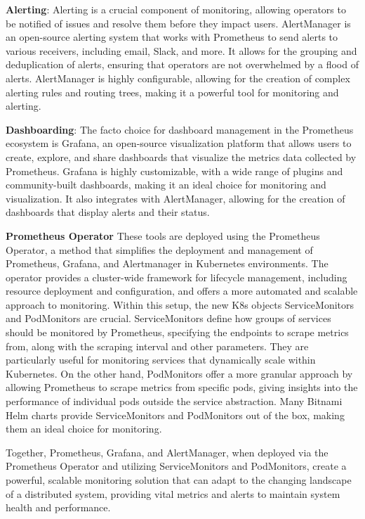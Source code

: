 \documentclass{article}
\begin{document}
    \textbf{Alerting}:
    Alerting is a crucial component of monitoring, allowing operators to be notified of issues and resolve them before they impact users. AlertManager is an open-source alerting system that works with Prometheus to send alerts to various receivers, including email, Slack, and more. It allows for the grouping and deduplication of alerts, ensuring that operators are not overwhelmed by a flood of alerts. AlertManager is highly configurable, allowing for the creation of complex alerting rules and routing trees, making it a powerful tool for monitoring and alerting.

    \textbf{Dashboarding}:
    The facto choice for dashboard management in the Prometheus ecosystem is Grafana, an open-source visualization platform that allows users to create, explore, and share dashboards that visualize the metrics data collected by Prometheus. Grafana is highly customizable, with a wide range of plugins and community-built dashboards, making it an ideal choice for monitoring and visualization. It also integrates with AlertManager, allowing for the creation of dashboards that display alerts and their status.

    \textbf{Prometheus Operator}
    These tools are deployed using the Prometheus Operator, a method that simplifies the deployment and management of Prometheus, Grafana, and Alertmanager in Kubernetes environments. The operator provides a cluster-wide framework for lifecycle management, including resource deployment and configuration, and offers a more automated and scalable approach to monitoring. Within this setup, the new K8s objects ServiceMonitors and PodMonitors are crucial. ServiceMonitors define how groups of services should be monitored by Prometheus, specifying the endpoints to scrape metrics from, along with the scraping interval and other parameters. They are particularly useful for monitoring services that dynamically scale within Kubernetes. On the other hand, PodMonitors offer a more granular approach by allowing Prometheus to scrape metrics from specific pods, giving insights into the performance of individual pods outside the service abstraction. Many Bitnami Helm charts provide ServiceMonitors and PodMonitors out of the box, making them an ideal choice for monitoring.

    Together, Prometheus, Grafana, and AlertManager, when deployed via the Prometheus Operator and utilizing ServiceMonitors and PodMonitors, create a powerful, scalable monitoring solution that can adapt to the changing landscape of a distributed system, providing vital metrics and alerts to maintain system health and performance.
\end{document}
